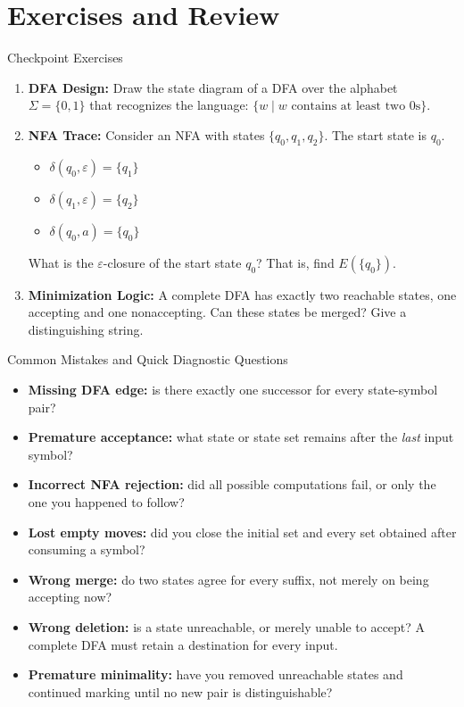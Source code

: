 \documentclass[10pt]{beamer}
\begin{document}
\section{Exercises and Review}

\begin{frame}{Checkpoint Exercises}
  \small
  \begin{enumerate}
      \item \textbf{DFA Design:} Draw the state diagram of a DFA over the alphabet $\Sigma = \{0, 1\}$ that recognizes the language: $\{w \mid w \text{ contains at least two 0s}\}$.
      \vspace{0.5cm}
      \item \textbf{NFA Trace:} Consider an NFA with states $\{q_0, q_1, q_2\}$. The start state is $q_0$.
      \begin{itemize}
          \item $\delta(q_0, \varepsilon) = \{q_1\}$
          \item $\delta(q_1, \varepsilon) = \{q_2\}$
          \item $\delta(q_0, a) = \{q_0\}$
      \end{itemize}
      What is the $\varepsilon$-closure of the start state $q_0$? That is, find $E(\{q_0\})$.
      \vspace{0.5cm}
      \item \textbf{Minimization Logic:} A complete DFA has exactly two
        reachable states, one accepting and one nonaccepting. Can these states
        be merged? Give a distinguishing string.
  \end{enumerate}
\end{frame}

\begin{frame}{Common Mistakes and Quick Diagnostic Questions}
  \small
  \begin{itemize}
    \item \textbf{Missing DFA edge:} is there exactly one successor for
      every state-symbol pair?
    \item \textbf{Premature acceptance:} what state or state set remains
      after the \emph{last} input symbol?
    \item \textbf{Incorrect NFA rejection:} did all possible computations
      fail, or only the one you happened to follow?
    \item \textbf{Lost empty moves:} did you close the initial set and every
      set obtained after consuming a symbol?
    \pause
    \item \textbf{Wrong merge:} do two states agree for every suffix, not
      merely on being accepting now?
    \item \textbf{Wrong deletion:} is a state unreachable, or merely unable
      to accept? A complete DFA must retain a destination for every input.
    \item \textbf{Premature minimality:} have you removed unreachable states
      and continued marking until no new pair is distinguishable?
  \end{itemize}
\end{frame}
\end{document}
